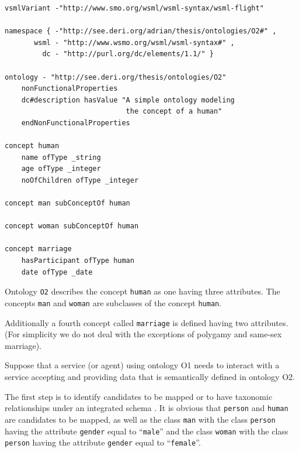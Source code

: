 \begin{lstlisting}
vsmlVariant -"http://www.smo.org/wsml/wsml-syntax/wsml-flight"

namespace { -"http://see.deri.org/adrian/thesis/ontologies/O2#" ,
       wsml - "http://www.wsmo.org/wsml/wsml-syntax#" ,
         dc - "http://purl.org/dc/elements/1.1/" }

ontology - "http://see.deri.org/thesis/ontologies/O2"
    nonFunctionalProperties
    dc#description hasValue "A simple ontology modeling
                             the concept of a human"
    endNonFunctionalProperties

concept human
    name ofType _string
    age ofType _integer
    noOfChildren ofType _integer

concept man subConceptOf human

concept woman subConceptOf human

concept marriage
    hasParticipant ofType human
    date ofType _date
\end{lstlisting}

Ontology \texttt{O2} describes the concept
\texttt{human} as one having three attributes. The
concepts \texttt{man} and \texttt{woman} are
subclasses of the concept \texttt{human}. 

Additionally a fourth concept called \texttt{marriage} is
defined having two attributes. (For simplicity we do not deal with the
exceptions of polygamy and same-sex marriage). 

Suppose that a service (or agent) using ontology O1 needs to interact
with a service accepting and providing data that is semantically
defined in ontology O2. 

The first step is to identify candidates to be mapped or to have
taxonomic relationships under an integrated schema \cite{shvaiko2005schema_based}. It is obvious that \texttt{person} and
\texttt{human} are candidates to be mapped, as well as the
class \texttt{man} with the class
\texttt{person} having the attribute
\texttt{gender} equal to
{\textquotedblleft}\texttt{male}{\textquotedblright} and
the class \texttt{woman} with the class
\texttt{person} having the attribute
\texttt{gender} equal to
{\textquotedblleft}\texttt{female}{\textquotedblright}. 

